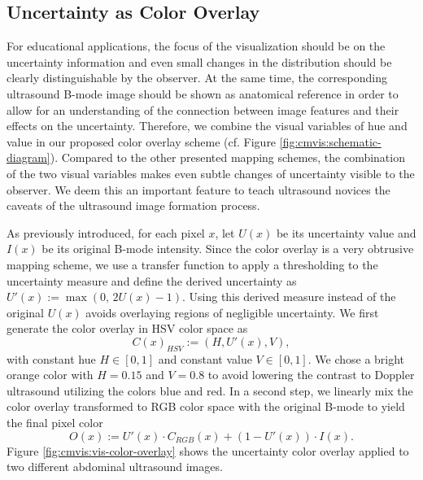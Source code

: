 \subsection{Uncertainty as Color Overlay}
\label{sec:cmvis:color-overlay}
For educational applications, the focus of the visualization should be on the uncertainty information and even small changes in the distribution should be clearly distinguishable by the observer.
At the same time, the corresponding ultrasound B-mode image should be shown as anatomical reference in order to allow for an understanding of the connection between image features and their effects on the uncertainty.
Therefore, we combine the visual variables of hue and value in our proposed color overlay scheme (cf. Figure \ref{fig:cmvis:schematic-diagram}).
Compared to the other presented mapping schemes, the combination of the two visual variables makes even subtle changes of uncertainty visible to the observer.
We deem this an important feature to teach ultrasound novices the caveats of the ultrasound image formation process.


As previously introduced, for each pixel $x$, let $U(x)$ be its uncertainty value and $I(x)$ be its original B-mode intensity.
Since the color overlay is a very obtrusive mapping scheme, we use a transfer function to apply a thresholding to the uncertainty measure and define the derived uncertainty as $U'(x) := \max \left( 0, \, 2 U(x) - 1 \right)$.
Using this derived measure instead of the original $U(x)$ avoids overlaying regions of negligible uncertainty.
We first generate the color overlay in HSV color space as
\begin{equation}
	C(x)_{HSV} := \left( H, U'(x), V \right),
\end{equation}
with constant hue $H \in [0, 1]$ and constant value $V \in [0, 1]$.
We chose a bright orange color with $H = 0.15$ and $V = 0.8$ to avoid lowering the contrast to Doppler ultrasound utilizing the colors blue and red.
In a second step, we linearly mix the color overlay transformed to RGB color space with the original B-mode to yield the final pixel color 
\begin{equation}
	O(x) := U'(x) \cdot C_{RGB}(x) + \left( 1 - U'(x) \right) \cdot I(x).
\end{equation}
Figure \ref{fig:cmvis:vis-color-overlay} shows the uncertainty color overlay applied to two different abdominal ultrasound images.

